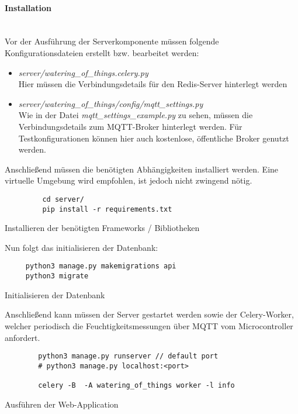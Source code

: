         \paragraph*{Installation}\mbox{}\\
        Vor der Ausführung der Serverkomponente müssen folgende Konfigurationsdateien erstellt bzw. bearbeitet werden:
        \begin{itemize}
            \item \textit{server/watering\_of\_things.celery.py}\\
            Hier müssen die Verbindungsdetails für den Redis-Server hinterlegt werden
            \item \textit{server/watering\_of\_things/config/mqtt\_settings.py}\\
            Wie in der Datei \textit{mqtt\_settings\_example.py} zu sehen, müssen die Verbindungsdetails zum MQTT-Broker hinterlegt werden. Für Testkonfigurationen können hier auch kostenlose, öffentliche Broker genutzt werden.
        \end{itemize}
     Anschließend müssen die benötigten Abhängigkeiten installiert werden. Eine virtuelle Umgebung wird empfohlen, ist jedoch nicht zwingend nötig.
     \begin{listing}[H]
         \begin{verbatim}
         cd server/
         pip install -r requirements.txt
         \end{verbatim}
         \caption{Installieren der benötigten Frameworks / Bibliotheken}
     \end{listing}
     
     Nun folgt das initialisieren der Datenbank:
     \begin{listing}[H]
     \begin{verbatim}
     python3 manage.py makemigrations api
     python3 migrate
     \end{verbatim}
     \caption{Initialisieren der Datenbank}
      \end{listing}

 
     Anschließend kann müssen der Server gestartet werden sowie der Celery-Worker, welcher periodisch die Feuchtigkeitsmessungen über MQTT vom Microcontroller anfordert.
    
    \begin{listing}[H]
        \begin{verbatim}
        python3 manage.py runserver // default port
        # python3 manage.py localhost:<port>
                
        celery -B  -A watering_of_things worker -l info
        \end{verbatim}
        \caption{Ausführen der Web-Application}
    \end{listing}
    
